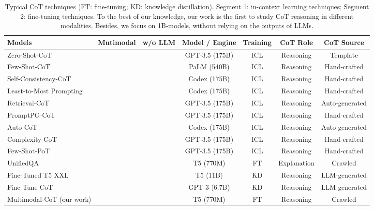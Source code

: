 \documentclass[nohyperref]{article}
\newcommand{\okmark}{{\textbf{\textcolor[rgb]{0.1, 0.5, 0.1}{}}}}
\newcommand{\ngmark}{{\textbf{\color{red}{\ding{55}}}}}
\theoremstyle{plain}
\theoremstyle{definition}
\theoremstyle{remark}
\begin{document}
\begin{table*}[htb]
\centering
\vspace{-3mm}
\renewcommand\tabcolsep{4.2pt} \small
\caption{Typical CoT techniques (FT: fine-tuning; KD: knowledge distillation). Segment 1: in-context learning techniques; Segment 2: fine-tuning techniques. To the best of our knowledge, our work is the first to study CoT reasoning in different modalities. Besides, we focus on 1B-models, without relying on the outputs of LLMs. \label{tab:cot_methods}
}
\begin{tabular}{lcccccc} 
\toprule
\textbf{Models} & \textbf{Mutimodal} & \textbf{w/o LLM}  & \textbf{Model / Engine}  & \textbf{Training}  & \textbf{CoT Role} & \textbf{CoT Source} \\ 
\midrule
Zero-Shot-CoT~\citep{kojima2022large} & \ngmark & \ngmark & GPT-3.5 (175B)  & ICL  & Reasoning & Template  \\
Few-Shot-CoT~\citep{cot_wei} & \ngmark & \ngmark   & PaLM (540B) & ICL & Reasoning & Hand-crafted \\
Self-Consistency-CoT~\citep{cot_wei_sc} & \ngmark & \ngmark & Codex  (175B) & ICL  & Reasoning& Hand-crafted   \\
Least-to-Most Prompting~\citep{zhou2022least}& \ngmark& \ngmark  & Codex (175B)  & ICL & Reasoning & Hand-crafted   \\
Retrieval-CoT~\citep{zhang2022automatic} & \ngmark& \ngmark  & GPT-3.5 (175B) & ICL  & Reasoning & Auto-generated  \\
PromptPG-CoT~\citep{lu2022dynamic} & \ngmark & \ngmark & GPT-3.5 (175B) & ICL & Reasoning  & Hand-crafted   \\
Auto-CoT~\citep{zhang2022automatic} & \ngmark & \ngmark  & Codex (175B)  & ICL & Reasoning  & Auto-generated \\
Complexity-CoT~\citep{fu2022complexity}& \ngmark & \ngmark  & GPT-3.5 (175B) & ICL  & Reasoning & Hand-crafted  \\
Few-Shot-PoT~\citep{chen2022program} & \ngmark & \ngmark & GPT-3.5 (175B) & ICL & Reasoning  & Hand-crafted  \\ 
\midrule
UnifiedQA~\citep{lu2022learn}& \ngmark  & \okmark   & T5 (770M)& FT & Explanation  & Crawled\\
Fine-Tuned T5 XXL~\citep{magister2022teaching}  & \ngmark & \ngmark  & T5 (11B)& KD & Reasoning  & LLM-generated \\
Fine-Tune-CoT \citep{ho2022large} & \ngmark & \ngmark  & GPT-3 (6.7B) & KD & Reasoning  & LLM-generated \\
Multimodal-CoT (our work) & \okmark &\okmark  & T5 (770M)& FT & Reasoning  & Crawled   \\ 
\bottomrule
\end{tabular}
\vspace{-5mm}
\end{table*}
\end{document}
